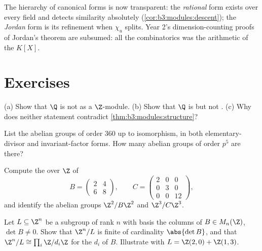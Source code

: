 \begin{remark}\label{rem:b3:modules:overview}
The hierarchy of canonical forms is now transparent: the
\emph{rational} form exists over every field and detects
similarity absolutely (\cref{cor:b3:modules:descent}); the
\emph{Jordan} form is its refinement when $\chi_u$ splits.
Year 2's dimension-counting proofs of Jordan's theorem are
subsumed: all the combinatorics was the arithmetic of the 
$K[X]$.
\end{remark}

\section{Exercises}

\begin{exercise}[$\star$]\label{exo:b3:modules:1}
(a) Show that $\Q$ is not  as a $\Z$-module.
(b) Show that $\Q$ is  but not .
(c) Why does neither statement contradict
\cref{thm:b3:modules:structure}?
\end{exercise}

\begin{exercise}[$\star$]\label{exo:b3:modules:2}
List the abelian groups of order $360$ up to isomorphism, in both
elementary-divisor and invariant-factor forms. How many abelian
groups of order $p^5$ are there?
\end{exercise}

\begin{exercise}[$\star$]\label{exo:b3:modules:3}
Compute the  over $\Z$ of
\[
B = \begin{pmatrix} 2 & 4\\ 6 & 8 \end{pmatrix},
\qquad
C = \begin{pmatrix} 2 & 0 & 0\\ 0 & 3 & 0\\ 0 & 0 & 12
\end{pmatrix},
\]
and identify the abelian groups $\Z^2/B\Z^2$ and $\Z^3/C\Z^3$.
\end{exercise}

\begin{exercise}[$\star\star$]\label{exo:b3:modules:4}
Let $L \subseteq \Z^n$ be a subgroup of rank $n$ with basis the
columns of $B \in M_n(\Z)$, $\det B \neq 0$. Show that
$\Z^n/L$ is finite of cardinality $\abs{\det B}$, and that $\Z^n/L
\cong \prod_i \Z/d_i\Z$ for the  $d_i$ of $B$.
Illustrate with $L = \Z(2,0) + \Z(1,3)$.
\end{exercise}


